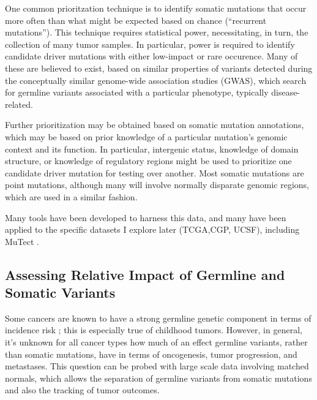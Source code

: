         One common prioritzation technique is to identify somatic
        mutations that occur more often than what might be expected
        based on chance (``recurrent mutations''). This technique
        requires statistical power, necessitating, in turn, the
        collection of many tumor
        samples\cite{leiserson_pan-cancer_2015}. In particular, power
        is required to identify candidate driver mutations with either
        low-impact or rare occurence. Many of these are believed to
        exist, based on similar properties of variants detected during
        the conceptually similar genome-wide association studies
        (GWAS), which search for germline variants associated with a
        particular phenotype, typically disease-related. 
        
        Further prioritization may be obtained based on somatic
        mutation annotations, which may be based on prior knowledge of
        a particular mutation's genomic context and its function. In particular,
        intergenic status, knowledge of domain structure, or knowledge
        of regulatory regions might be used to prioritize one
        candidate driver mutation for testing over another. Most
        somatic mutations are point mutations, although 
        many will involve normally disparate genomic regions, which
        are used in a similar fashion.

        Many tools have been developed to harness this data, and many
        have been applied to the specific datasets I explore later
        (TCGA,CGP, UCSF), including MuTect
        \cite{cibulskis_sensitive_2013}.


        \subsection{Assessing Relative Impact of Germline and Somatic Variants}

        Some cancers are known to have a strong germline genetic component in
        terms of incidence risk ; this is especially true of
        childhood tumors. However, in general, it's unknown for all
        cancer types how much of an effect germline variants, rather
        than somatic mutations, have in terms of oncogenesis,
        tumor progression, and metastases. This question can be probed
        with large scale data        
        involving matched normals, which allows the separation of
        germline variants from somatic mutations and also the tracking
        of tumor outcomes.

